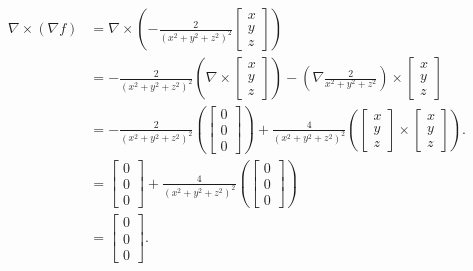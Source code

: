\documentclass[11pt]{article}
\renewcommand{\grad}{\nabla}
\begin{document}
\begin{align*}
	\grad \times (\grad f) &= \grad \times \left( -\frac{2}{(x^{2} + y^{2} + z^{2})^{2}} \begin{bmatrix} x \\ y \\ z \end{bmatrix} \right) \\
	&= -\frac{2}{(x^{2} + y^{2} + z^{2})^{2}} \left( \grad \times \begin{bmatrix} x \\ y \\ z \end{bmatrix} \right) - \left( \grad \frac{2}{x^{2} + y^{2} + z^{2}} \right) \times \begin{bmatrix} x \\ y \\ z \end{bmatrix} \\
	&= -\frac{2}{(x^{2} + y^{2} + z^{2})^{2}} \left( \begin{bmatrix} 0 \\ 0 \\ 0 \end{bmatrix} \right) + \frac{4}{(x^{2} + y^{2} + z^{2})^{2}} \left( \begin{bmatrix} x \\ y \\ z \end{bmatrix} \times \begin{bmatrix} x \\ y \\ z \end{bmatrix} \right). \\
	&= \begin{bmatrix} 0 \\ 0 \\ 0 \end{bmatrix} + \frac{4}{(x^{2} + y^{2} + z^{2})^{2}} \left( \begin{bmatrix} 0 \\ 0 \\ 0 \end{bmatrix} \right) \\
	&= \begin{bmatrix} 0 \\ 0 \\ 0 \end{bmatrix}.
\end{align*}

\end{document}
